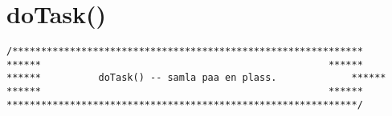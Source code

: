 




\chapter{doTask()} %
\label{appendixDifferentDoTaskFunctions} 

\begin{lstlisting}
/*************************************************************
****** 													******
******  		doTask() -- samla paa en plass. 			******
****** 													******
*************************************************************/
\end{lstlisting}





